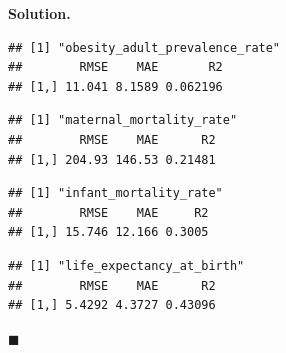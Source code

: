 \documentclass[10pt,b5paper,krantz1]{krantz}
\newenvironment{Shaded}{\begin{snugshade}}{\end{snugshade}}
\newcommand{\CommentTok}[1]{\textcolor[rgb]{0.37,0.37,0.37}{\textit{#1}}}
\newcommand{\ControlFlowTok}[1]{\textcolor[rgb]{0.27,0.27,0.27}{\textbf{#1}}}
\newcommand{\DataTypeTok}[1]{\textcolor[rgb]{0.27,0.27,0.27}{#1}}
\newcommand{\DecValTok}[1]{\textcolor[rgb]{0.06,0.06,0.06}{#1}}
\newcommand{\KeywordTok}[1]{\textcolor[rgb]{0.27,0.27,0.27}{\textbf{#1}}}
\newcommand{\NormalTok}[1]{#1}
\newcommand{\OperatorTok}[1]{\textcolor[rgb]{0.43,0.43,0.43}{\textbf{#1}}}
\newcommand{\StringTok}[1]{\textcolor[rgb]{0.5,0.5,0.5}{#1}}
\newenvironment{solution}{%
\bigskip\noindent\textbf{Solution. }%
\it\ignorespaces%
\ignorespaces%
}{\ignorespaces%
\hfill$\blacksquare$%
}
\begin{document}
\begin{solution}
\begin{Shaded}
\end{Shaded}

\begin{verbatim}
## [1] "obesity_adult_prevalence_rate"
##        RMSE    MAE       R2
## [1,] 11.041 8.1589 0.062196
\end{verbatim}

\begin{verbatim}
## [1] "maternal_mortality_rate"
##        RMSE    MAE      R2
## [1,] 204.93 146.53 0.21481
\end{verbatim}

\begin{verbatim}
## [1] "infant_mortality_rate"
##        RMSE    MAE     R2
## [1,] 15.746 12.166 0.3005
\end{verbatim}

\begin{verbatim}
## [1] "life_expectancy_at_birth"
##        RMSE    MAE      R2
## [1,] 5.4292 4.3727 0.43096
\end{verbatim}


\end{solution}
\end{document}
